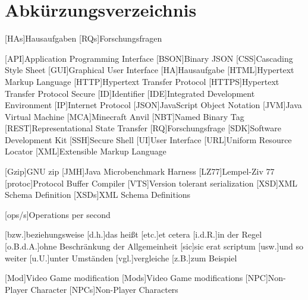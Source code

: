 \chapter*{Abkürzungsverzeichnis}


[HAs]{Hausaufgaben}
[RQs]{Forschungsfragen}

\begin{acronym}[XXXXXX] %
    [API]{Application Programming Interface}
    [BSON]{Binary JSON}
    [CSS]{Cascading Style Sheet}
    [GUI]{Graphical User Interface}
    [HA]{Hausaufgabe}
    [HTML]{Hypertext Markup Language}
    [HTTP]{Hypertext Transfer Protocol}
    [HTTPS]{Hypertext Transfer Protocol Secure}
    [ID]{Identifier}
    [IDE]{Integrated Development Environment}
    [IP]{Internet Protocol}
    [JSON]{JavaScript Object Notation}
    [JVM]{Java Virtual Machine}
    [MCA]{Minecraft Anvil}
    [NBT]{Named Binary Tag}
    [REST]{Representational State Transfer}
    [RQ]{Forschungsfrage}
    [SDK]{Software Development Kit}
    [SSH]{Secure Shell}
    [UI]{User Interface}
    [URL]{Uniform Resource Locator}
    [XML]{Extensible Markup Language}
    
    \vspace{\parskip}
    
    [Gzip]{GNU zip}
    [JMH]{Java Microbenchmark Harness}
    [LZ77]{Lempel-Ziv 77}
    [protoc]{Protocol Buffer Compiler}
    [VTS]{Version tolerant serialization}
    [XSD]{XML Schema Definition}
    [XSDs]{XML Schema Definitions}
    
    \vspace{\parskip}

    [ops/s]{Operations per second}

    \vspace{\parskip}

    [bzw.]{beziehungsweise}
    [d.h.]{das heißt}
    [etc.]{et cetera}
    [i.d.R.]{in der Regel}
    [o.B.d.A.]{ohne Beschränkung der Allgemeinheit}
    [sic]{sic erat scriptum}
    [usw.]{und so weiter}
    [u.U.]{unter Umständen}
    [vgl.]{vergleiche}
    [z.B.]{zum Beispiel}

    \vspace{\parskip}

    [Mod]{Video Game modification}
    [Mods]{Video Game modifications}
    [NPC]{Non-Player Character}
    [NPCs]{Non-Player Characters}
\end{acronym}
